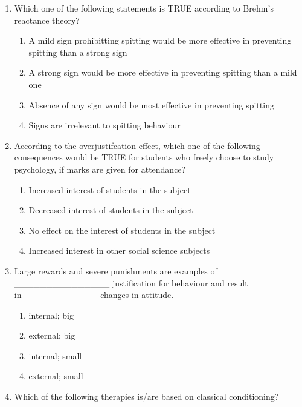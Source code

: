\documentclass[12pt]{article}
\theoremstyle{remark}
\begin{document}
\begin{enumerate}
\begin{enumerate}
 \end{enumerate}
\hfill{}
\item Which one of the following statements is TRUE according to Brehm’s reactance theory?
\begin{enumerate}
    \item A mild sign prohibitting spitting would be more effective in preventing spitting than a strong sign
    \item A strong sign would be more effective in preventing spitting than a mild one
    \item Absence of any sign would be most effective in preventing spitting
    \item Signs are irrelevant to spitting behaviour
\end{enumerate}
\hfill{}
\item According to the overjustifcation effect, which one of the following consequences would be TRUE for students who freely choose to study psychology, if marks are given for attendance?
\begin{enumerate}
    \item Increased interest of students in the subject
    \item Decreased interest of students in the subject
    \item No effect on the interest of students in the subject
    \item Increased interest in other social science subjects
\end{enumerate}
\hfill{}
\item Large rewards and severe punishments are examples of \_\_\_\_\_\_\_\_\_\_\_\_\_\_\_ justification for behaviour and result in\_\_\_\_\_\_\_\_\_\_\_\_ changes in attitude.
\begin{enumerate}
    \item internal; big
    \item external; big
    \item internal; small
    \item external; small
\end{enumerate}
\hfill{}
\item Which of the following therapies is/are based on classical conditioning?

\end{enumerate}
\end{document}
